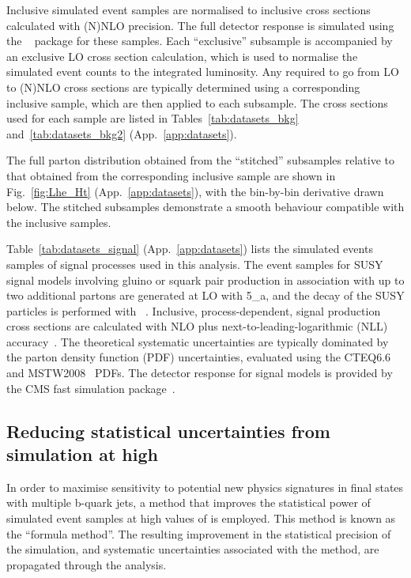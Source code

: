 Inclusive simulated event samples are normalised to inclusive cross
sections calculated with (N)NLO precision. The full detector response
is simulated using the \GEANTfour~\cite{geant} package for these
samples. Each ``exclusive'' subsample is accompanied by an exclusive
LO cross section calculation, which is used to normalise the simulated
event counts to the integrated luminosity. Any \kfactors required to
go from LO to (N)NLO cross sections are typically determined using a
corresponding inclusive sample, which are then applied to each
subsample. The cross sections used for each sample are listed in
Tables~\ref{tab:datasets_bkg} and~\ref{tab:datasets_bkg2}
(App.~\ref{app:datasets}). 

The full parton \scalht distribution obtained from the ``stitched''
subsamples relative to that obtained from the corresponding inclusive
sample are shown in Fig.~\ref{fig:Lhe_Ht} (App.~\ref{app:datasets}),
with the bin-by-bin derivative drawn below. The stitched subsamples
demonstrate a smooth behaviour compatible with the inclusive samples.

Table~\ref{tab:datasets_signal} (App.~\ref{app:datasets}) lists the
simulated events samples of signal processes used in this
analysis. The event samples for SUSY signal models involving gluino or
squark pair production in association with up to two additional
partons are generated at LO with {\MADGRAPH{}5\_a\MCATNLO}, and the
decay of the SUSY particles is performed with ~\cite{pythia}. Inclusive, process-dependent, signal production
cross sections are calculated with NLO plus
next-to-leading-logarithmic (NLL) accuracy~\cite{Beenakker:1996ch,
  PhysRevLett.102.111802, PhysRevD.80.095004, 1126-6708-2009-12-041,
  doi:10.1142/S0217751X11053560, susynlo}. The theoretical systematic
uncertainties are typically dominated by the parton density function
(PDF) uncertainties, evaluated using the
CTEQ6.6~\cite{Nadolsky:2008zw} and MSTW2008~\cite{Martin:2009iq} PDFs.
The detector response for signal models is provided by the CMS fast
simulation package~\cite{fastsim}.

\subsection{Reducing statistical uncertainties from simulation at high \texorpdfstring{\nb}{Nb}}

In order to maximise sensitivity to potential new physics signatures
in final states with multiple b-quark jets, a method that improves the
statistical power of simulated event samples at high values of \nb is
employed. This method is known as the ``formula method''. The
resulting improvement in the statistical precision of the simulation,
and systematic uncertainties associated with the method, are
propagated through the analysis.

